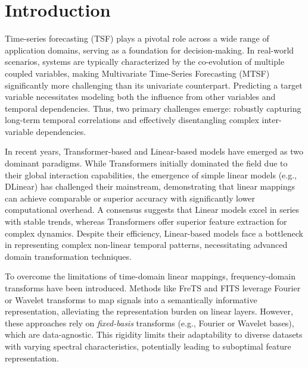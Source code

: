\documentclass[final,3p,times]{elsarticle}
\begin{document}


\section{Introduction}

Time-series forecasting (TSF) plays a pivotal role across a wide range of application domains, serving as a foundation for decision-making\cite{carli2020iot,wang2020controllability}. In real-world scenarios, systems are typically characterized by the co-evolution of multiple coupled variables, making Multivariate Time-Series Forecasting (MTSF) significantly more challenging than its univariate counterpart\cite{stock2001vector,lim2021temporal}. Predicting a target variable necessitates modeling both the influence from other variables and temporal dependencies. Thus, two primary challenges emerge: robustly capturing long-term temporal correlations and effectively disentangling complex inter-variable dependencies.

In recent years, Transformer-based and Linear-based models have emerged as two dominant paradigms. While Transformers initially dominated the field due to their global interaction capabilities\cite{zhou2021informer,wu2021autoformer,piao2024fredformer,liu2022non,cirstea2022triformer}, the emergence of simple linear models (e.g., DLinear\cite{zeng2023transformers}) has challenged their mainstream, demonstrating that linear mappings can achieve comparable or superior accuracy with significantly lower computational overhead. A consensus suggests that Linear models excel in series with stable trends, whereas Transformers offer superior feature extraction for complex dynamics\cite{li2023revisiting}. Despite their efficiency, Linear-based models face a bottleneck in representing complex non-linear temporal patterns, necessitating advanced domain transformation techniques.

To overcome the limitations of time-domain linear mappings, frequency-domain transforms have been introduced. Methods like FreTS\cite{yi2023frequency} and FITS\cite{xu2024fits} leverage Fourier\cite{bloomfield2004fourier} or Wavelet transforms\cite{grossmann1984decomposition} to map signals into a semantically informative representation, alleviating the representation burden on linear layers\cite{sasal2022w}. However, these approaches rely on \textit{fixed-basis} transforms (e.g., Fourier or Wavelet bases), which are data-agnostic. This rigidity limits their adaptability to diverse datasets with varying spectral characteristics, potentially leading to suboptimal feature representation. 
\end{document}
